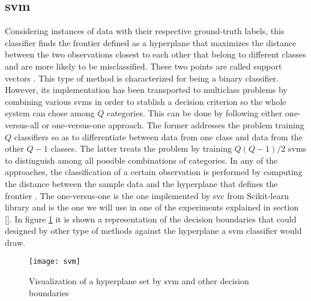 
\subsection{\acrfull{svm}}
\label{subsection:svm}

	Considering instances of data with their respective ground-truth labels, this classifier finds the frontier defined as a hyperplane that maximizes the distance between the two observations closest to each other that belong to different classes and are more likely to be misclassified. These two points are called support vectors \cite{Fu2011}. This type of method is characterized for being a binary classifier. However, its implementation has been transported to multiclass problems by combining various \acrshort{svm}s in order to stablish a decision criterion so the whole system can chose among $Q$ categories. This can be done by following either one-versus-all or one-versus-one approach. The former addresses the problem training $Q$ classifiers so as to differentiate between data from one class and data from the other $Q-1$ classes. The latter treats the problem by training $Q(Q-1)/2$ \acrshort{svm}s to distinguish among all possible combinations of categories. In any of the approaches, the classification of a certain observation is performed by computing the distance between the sample data and the hyperplane that defines the frontier \cite{Barchiesi2015}. The one-versus-one is the one implemented by \acrfull{svc} from Scikit-learn library and is the one we will use in one of the experiments explained in section \ref{}. In figure \ref{fig:mesh10} it is shown a representation of the decision boundaries that could designed by other type of methods against the hyperplane a \acrshort{svm} classifier would draw.
	
	\begin{figure}[h]
		\centering
		\captionsetup{justification=centering}
		\texttt{[image: svm]}
		\caption{Visualization of a hyperplane set by \acrshort{svm} and other decision boundaries \cite{Drakos2018}}
		\label{fig:mesh10}
	\end{figure}
	
